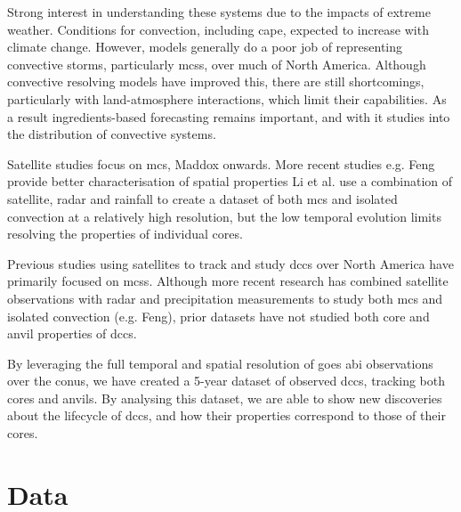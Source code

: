 Strong interest in understanding these systems due to the impacts of extreme weather.
Conditions for convection, including \acrshort{cape}, expected to increase with climate change.
However, models generally do a poor job of representing convective storms, particularly \acrshort{mcs}s, over much of North America.
Although convective resolving models have improved this, there are still shortcomings, particularly with land-atmosphere interactions, which limit their capabilities.
As a result ingredients-based forecasting remains important, and with it studies into the distribution of convective systems.

Satellite studies focus on \acrshort{mcs}, Maddox onwards.
More recent studies e.g. Feng provide better characterisation of spatial properties
Li et al. use a combination of satellite, radar and rainfall to create a dataset of both \acrshort{mcs} and isolated convection at a relatively high resolution, but the low temporal evolution limits resolving the properties of individual cores.


Previous studies using satellites to track and study \acrshort{dcc}s over North America have primarily focused on \acrshort{mcs}s.
Although more recent research has combined satellite observations with radar and precipitation measurements to study both \acrshort{mcs} and isolated convection (e.g. Feng), prior datasets have not studied both core and anvil properties of \acrshort{dcc}s.

By leveraging the full temporal and spatial resolution of \acrshort{goes} \acrshort{abi} observations over the \acrshort{conus}, we have created a 5-year dataset of observed \acrshort{dcc}s, tracking both cores and anvils.
By analysing this dataset, we are able to show new discoveries about the lifecycle of \acrshort{dcc}s, and how their properties correspond to those of their cores.

\section{Data}

